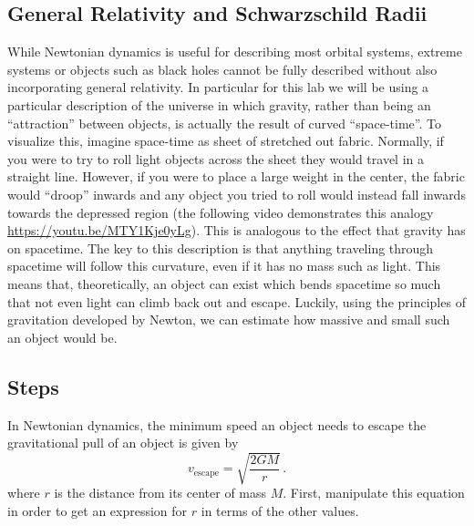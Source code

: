 \begin{itemize}
\section{General Relativity and Schwarzschild Radii}
While Newtonian dynamics is useful for describing most orbital systems, extreme systems or objects such as black holes cannot be fully described without also incorporating general relativity. In particular for this lab we will be using a particular description of the universe in which gravity, rather than being an ``attraction'' between objects, is actually the result of curved ``space-time''. To visualize this, imagine space-time as sheet of stretched out fabric. Normally, if you were to try to roll light objects across the sheet they would travel in a straight line. However, if you were to place a large weight in the center, the fabric would ``droop'' inwards and any object you tried to roll would instead fall inwards towards the depressed region (the following video demonstrates this analogy \url{https://youtu.be/MTY1Kje0yLg}). This is analogous to the effect that gravity has on spacetime. The key to this description is that anything traveling through spacetime will follow this curvature, even if it has no mass such as light. This means that, theoretically, an object can exist which bends spacetime so much that not even light can climb back out and escape. Luckily, using the principles of gravitation developed by Newton, we can estimate how massive and small such an object would be.

\subsection{Steps}
\begin{steps}
	\item In Newtonian dynamics, the minimum speed an object needs to escape the gravitational pull of an object is given by 
	\begin{equation}\label{gc:eq:escape-speed}
		v_\textrm{escape} = \sqrt{\frac{2 G M}{r}} \,.
	\end{equation}
	where $r$ is the distance from its center of mass $M$. First, manipulate this equation in order to get an expression for $r$ in terms of the other values.
	

\end{steps}
\end{itemize}
